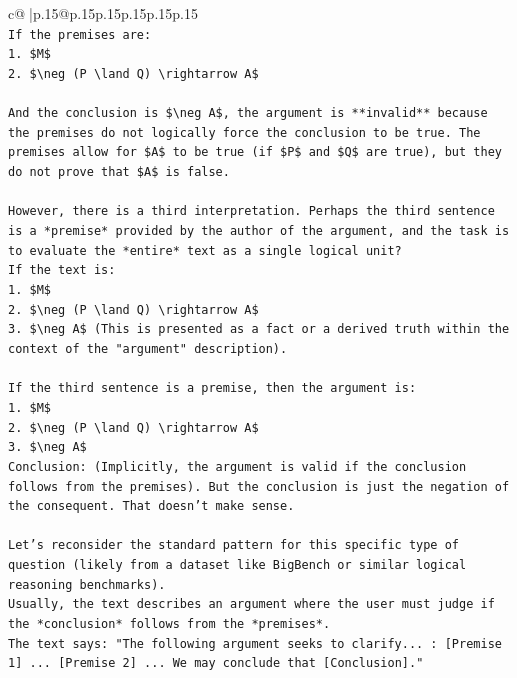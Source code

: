 \documentclass{article}
\begin{document}
{\begin{supertabular}{c@{$\;$}|p{.15\linewidth}@{}p{.15\linewidth}p{.15\linewidth}p{.15\linewidth}p{.15\linewidth}p{.15\linewidth}}
{{{\\ 
\texttt{If the premises are:} \\
\texttt{1.  \$M\$} \\
\texttt{2.  \$\textbackslash{}neg (P \textbackslash{}land Q) \textbackslash{}rightarrow A\$} \\
\\ 
\texttt{And the conclusion is \$\textbackslash{}neg A\$, the argument is **invalid** because the premises do not logically force the conclusion to be true. The premises allow for \$A\$ to be true (if \$P\$ and \$Q\$ are true), but they do not prove that \$A\$ is false.} \\
\\ 
\texttt{However, there is a third interpretation. Perhaps the third sentence is a *premise* provided by the author of the argument, and the task is to evaluate the *entire* text as a single logical unit?} \\
\texttt{If the text is:} \\
\texttt{1.  \$M\$} \\
\texttt{2.  \$\textbackslash{}neg (P \textbackslash{}land Q) \textbackslash{}rightarrow A\$} \\
\texttt{3.  \$\textbackslash{}neg A\$ (This is presented as a fact or a derived truth within the context of the "argument" description).} \\
\\ 
\texttt{If the third sentence is a premise, then the argument is:} \\
\texttt{1.  \$M\$} \\
\texttt{2.  \$\textbackslash{}neg (P \textbackslash{}land Q) \textbackslash{}rightarrow A\$} \\
\texttt{3.  \$\textbackslash{}neg A\$} \\
\texttt{Conclusion: (Implicitly, the argument is valid if the conclusion follows from the premises). But the conclusion is just the negation of the consequent. That doesn't make sense.} \\
\\ 
\texttt{Let's reconsider the standard pattern for this specific type of question (likely from a dataset like BigBench or similar logical reasoning benchmarks).} \\
\texttt{Usually, the text describes an argument where the user must judge if the *conclusion* follows from the *premises*.} \\
\texttt{The text says: "The following argument seeks to clarify... : {[}Premise 1{]} ... {[}Premise 2{]} ... We may conclude that {[}Conclusion{]}."} \\
}}}
\end{supertabular}}
\end{document}
